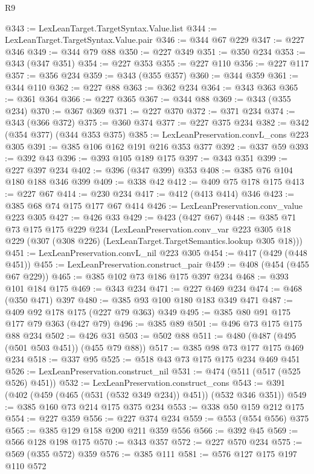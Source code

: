 \begin{lexlean}{R9}
\begin{coremodule}
@343 := LexLeanTarget.TargetSyntax.Value.list
@344 := LexLeanTarget.TargetSyntax.Value.pair
@346 := @344 @67 @229
@347 := @227 @346
@349 := @344 @79 @88
@350 := @227 @349
@351 := @350 @234
@353 := @343 (@347 @351)
@354 := @227 @353
@355 := @227 @110
@356 := @227 @117
@357 := @356 @234
@359 := @343 (@355 @357)
@360 := @344 @359
@361 := @344 @110
@362 := @227 @88
@363 := @362 @234
@364 := @343 @363
@365 := @361 @364
@366 := @227 @365
@367 := @344 @88
@369 := @343 (@355 @234)
@370 := @367 @369
@371 := @227 @370
@372 := @371 @234
@374 := @343 (@366 @372)
@375 := @360 @374
@377 := @227 @375 @234
@382 := @342 (@354 @377) (@344 @353 @375)
@385 := LexLeanPreservation.convL_cons @223 @305
@391 := @385 @106 @162 @191 @216 @353 @377
@392 := @337 @59
@393 := @392 @43
@396 := @393 @105 @189 @175
@397 := @343 @351
@399 := @227 @397 @234
@402 := @396 (@347 @399) @353
@408 := @385 @76 @104 @180 @188 @346 @399
@409 := @338 @42
@412 := @409 @75 @178 @175
@413 := @227 @67
@414 := @230 @234
@417 := @412 (@413 @414) @346
@423 := @385 @68 @74 @175 @177 @67 @414
@426 := LexLeanPreservation.conv_value @223 @305
@427 := @426 @33
@429 := @423 (@427 @67)
@448 := @385
    @71
    @73
    @175
    @175
    @229
    @234
    (LexLeanPreservation.conv_var
      @223
      @305
      @18
      @229
      (@307 (@308 @226) (LexLeanTarget.TargetSemantics.lookup @305 @18)))
@451 := LexLeanPreservation.convL_nil @223 @305
@454 := @417 (@429 (@448 @451))
@455 := LexLeanPreservation.construct_pair
@459 := @408 (@454 (@455 @67 @229))
@465 := @385 @102 @73 @186 @175 @397 @234
@468 := @393 @101 @184 @175
@469 := @343 @234
@471 := @227 @469 @234
@474 := @468 (@350 @471) @397
@480 := @385 @93 @100 @180 @183 @349 @471
@487 := @409 @92 @178 @175 (@227 @79 @363) @349
@495 := @385 @80 @91 @175 @177 @79 @363 (@427 @79)
@496 := @385 @89
@501 := @496 @73 @175 @175 @88 @234
@502 := @426 @31
@503 := @502 @88
@511 := @480 (@487 (@495 (@501 @503 @451)) (@455 @79 @88))
@517 := @385 @98 @73 @177 @175 @469 @234
@518 := @337 @95
@525 := @518 @43 @73 @175 @175 @234 @469 @451
@526 := LexLeanPreservation.construct_nil
@531 := @474 (@511 (@517 (@525 @526) @451))
@532 := LexLeanPreservation.construct_cons
@543 := @391 (@402 (@459 (@465 (@531 (@532 @349 @234)) @451)) (@532 @346 @351))
@549 := @385 @160 @73 @214 @175 @375 @234
@553 := @338 @50 @159 @212 @175
@554 := @227 @359
@556 := @227 @374 @234
@559 := @553 (@554 @556) @375
@565 := @385 @129 @158 @200 @211 @359 @556
@566 := @392 @45
@569 := @566 @128 @198 @175
@570 := @343 @357
@572 := @227 @570 @234
@575 := @569 (@355 @572) @359
@576 := @385 @111
@581 := @576 @127 @175 @197 @110 @572

\end{coremodule}
\end{lexlean}
